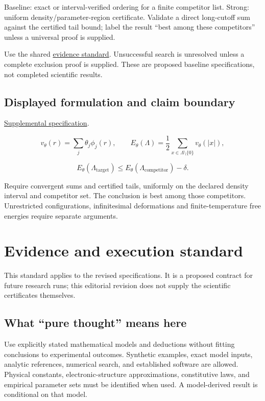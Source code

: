 \documentclass[
  11pt,
]{article}
\begin{document}
Baseline: exact or interval-verified ordering for a finite competitor
list. Strong: uniform density/parameter-region certificate. Validate a
direct long-cutoff sum against the certified tail bound; label the
result ``best among these competitors'' unless a universal proof is
supplied.

Use the shared
\href{https://github.com/rick-stevens-ai/Pure-Thought/blob/main/reviews/EVIDENCE-STANDARD.md}{evidence
standard}. Unsuccessful search is unresolved unless a complete exclusion
proof is supplied. These are proposed baseline specifications, not
completed scientific results.

\subsection{Displayed formulation and claim boundary}

\href{https://github.com/rick-stevens-ai/Pure-Thought/blob/main/supplemental/S06.md}{Supplemental
specification}.

\[v_\theta(r)=\sum_j\theta_j\phi_j(r),\qquad
E_\theta(\Lambda)=\frac12\sum_{x\in\Lambda\setminus\{0\}}v_\theta(|x|),\]

\[E_\theta(\Lambda_{\mathrm{target}})\le
E_\theta(\Lambda_{\mathrm{competitor}})-\delta.\]

Require convergent sums and certified tails, uniformly on the declared
density interval and competitor set. The conclusion is best among those
competitors. Unrestricted configurations, infinitesimal deformations and
finite-temperature free energies require separate arguments.

\section{Evidence and execution standard}

This standard applies to the revised specifications. It is a proposed
contract for future research runs; this editorial revision does not
supply the scientific certificates themselves.

\subsection{What ``pure thought'' means here}

Use explicitly stated mathematical models and deductions without fitting
conclusions to experimental outcomes. Synthetic examples, exact model
inputs, analytic references, numerical search, and established software
are allowed. Physical constants, electronic-structure approximations,
constitutive laws, and empirical parameter sets must be identified when
used. A model-derived result is conditional on that model.
\end{document}
